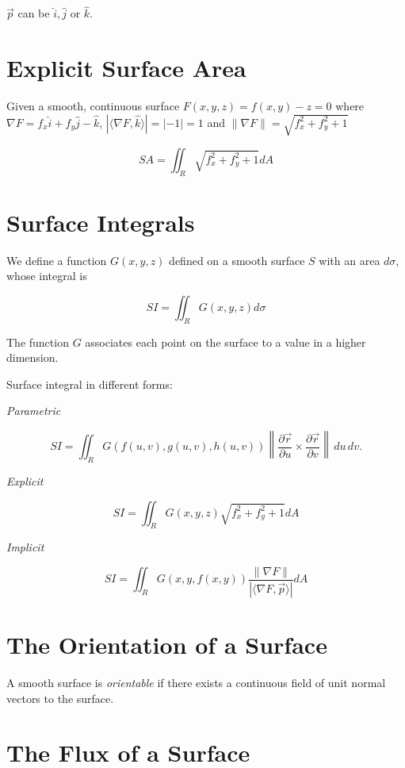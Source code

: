 \(\vec{p}\) can be \(\hat{i}, \hat{j}\) or \(\hat{k}\).

\section{Explicit Surface Area}

Given a smooth, continuous surface \(F(x,y,z) = f(x,y) - z = 0\) where \(\nabla F = f_x \hat{i} + f_y \hat{j} - \hat{k} \), 
\(  | \langle \nabla F , \hat{k} \rangle | = |-1| = 1\) and \( \| \nabla F \| = \sqrt{f_{x}^{2} + f_{y}^{2} + 1} \)

\[
    SA = \iint_{R}  \sqrt{f_{x}^{2} + f_{y}^{2} + 1} dA
\]

\section{Surface Integrals}

We define a function \(G(x,y,z)\) defined on a smooth surface \(S\) with an area \(d\sigma\), whose integral is  

\[
    SI = \iint_R G(x,y,z) d\sigma
\]

The function \(G\) associates each point on the surface to a value in a higher dimension.

Surface integral in different forms:

\emph{Parametric}

\[
    SI = \iint_{R} G(f(u,v), g(u,v), h(u,v))\left\| \frac{\partial \vec{r}}{\partial u} \times \frac{\partial \vec{r}}{\partial v} \right\| \, du \, dv.
\]

\emph{Explicit}

\[
    SI = \iint_{R} G(x,y,z) \sqrt{f_{x}^{2} + f_{y}^{2} + 1} dA
\]

\emph{Implicit}

\[
    SI = \iint_{R} G(x,y, f(x,y)) \frac{\|\nabla F\|}{|\langle \nabla F, \vec{p}\rangle|} dA
\]

\section{The Orientation of a Surface}

A smooth surface is \emph{orientable} if there exists a continuous field of unit normal vectors to the surface.

\section{The Flux of a Surface}

